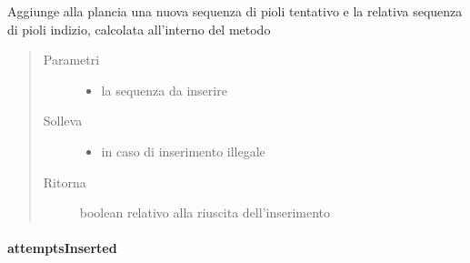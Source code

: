 \documentclass[letterpaper,10pt,italian,openany,oneside]{sphinxmanual}
\begin{document}
\begin{fulllineitems}
\label{\detokenize{source/it/unicam/cs/pa/mastermind/gamecore/BoardModel:it.unicam.cs.pa.mastermind.gamecore.BoardModel.addAttempt(List)}}
Aggiunge alla plancia una nuova sequenza di pioli tentativo e la relativa sequenza di pioli indizio, calcolata all’interno del metodo
\begin{quote}\begin{description}
\item[{Parametri}] \leavevmode\begin{itemize}
\item {} 
 \textendash{} la sequenza da inserire

\end{itemize}

\item[{Solleva}] \leavevmode\begin{itemize}
\item {} 
 \textendash{} in caso di inserimento illegale

\end{itemize}

\item[{Ritorna}] \leavevmode
boolean relativo alla riuscita dell’inserimento

\end{description}\end{quote}

\end{fulllineitems}



\paragraph{attemptsInserted}
\label{\detokenize{source/it/unicam/cs/pa/mastermind/gamecore/BoardModel:attemptsinserted}}
\end{document}
